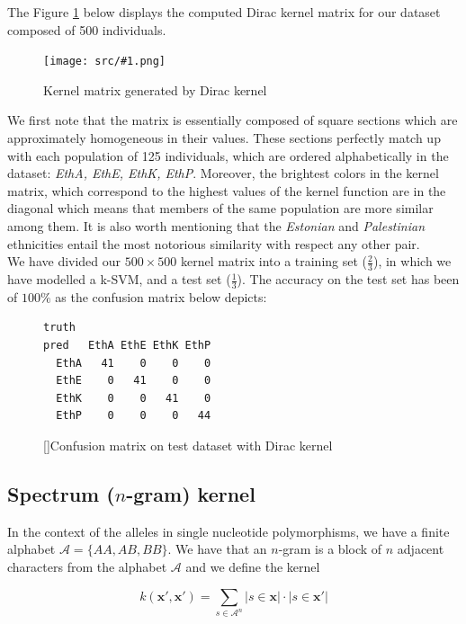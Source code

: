 \documentclass[a4paper, 11pt]{article}
\newcommand{\Figure}[3]{
	\begin{figure}[!h]
	\centering
	\texttt{[image: src/\#1.png]}
	\caption{#3}
	\label{fig:#1}
	\end{figure}
}
\theoremstyle{definition}
\theoremstyle{remark}
\begin{document}
The Figure \ref{fig:dirac_kernel} below displays the computed Dirac kernel matrix for our dataset composed of 500 individuals.

\Figure{dirac_kernel}{8.2}{Kernel matrix generated by Dirac kernel}

We first note that the matrix is essentially composed of square sections which are approximately homogeneous in their values. These sections perfectly match up with each population of 125 individuals, which are ordered alphabetically in the dataset: \textit{EthA, EthE, EthK, EthP}. Moreover, the brightest colors in the kernel matrix, which correspond to the highest values of the kernel function are in the diagonal which means that members of the same population are more similar among them. It is also worth mentioning that the \textit{Estonian} and \textit{Palestinian} ethnicities entail the most notorious similarity with respect any other pair.\\

We have divided our $500\times 500$ kernel matrix into a training set ($\frac{2}{3}$), in which we have modelled a k-SVM, and a test set ($\frac{1}{3}$). The accuracy on the test set has been of $100\%$ as the confusion matrix below depicts:

\begin{figure}[!h]
\centering
\begin{BVerbatim}[baselinestretch=1]
      truth
pred   EthA EthE EthK EthP
  EthA   41    0    0    0
  EthE    0   41    0    0
  EthK    0    0   41    0
  EthP    0    0    0   44  
\end{BVerbatim}    
[]{Confusion matrix on test dataset with Dirac kernel}
\end{figure}



\subsection{Spectrum ($n$-gram) kernel}

In the context of the alleles in single nucleotide polymorphisms, we have a finite alphabet $\mathcal{A} = \{AA, AB, BB\}$. We have that an $n$-gram is a block of $n$ adjacent characters from the alphabet $\mathcal{A}$ and we define the kernel

\begin{equation*}
    k(\mathbf{x'}, \mathbf{x'}) = \sum_{s\in \mathcal{A}^n} |s\in \mathbf{x}| \cdot |s\in \mathbf{x'}|
\end{equation*}
\end{document}
